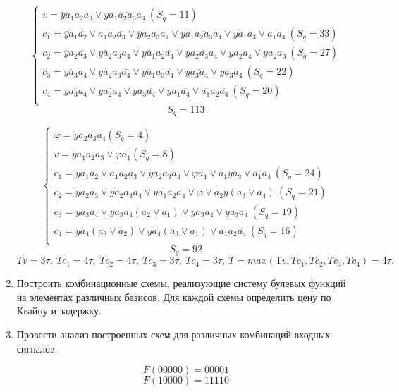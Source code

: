 \documentclass{article}
\begin{document}
\begin{enumerate}
$$\left\{ \begin{array}{l}
       v=  \overline{y}a_1a_2a_3∨y\overline{a_1a_2a_3a_4}\ (S_q=11) \\
       c_1=  \overline{y}a_1\overline{a_2}∨a_1a_2\overline{a_3}∨\overline{y}a_2a_3a_4∨y\overline{a_1a_2a_3a_4}∨ya_1a_3∨a_1a_4\  (S_q=33) \\
       c_2=\overline{y}a_2\overline{a_3}∨\overline{ya_2}a_3a_4∨\overline{ya_1}a_2\overline{a_4}∨y\overline{a_2a_3a_4}∨ya_2a_4∨ya_2a_3\ (S_q=27) \\
       c_3= \overline{ya_3}a_4∨\overline{ya_2}a_3\overline{a_4}∨\overline{ya_1}a_3\overline{a_4}∨y\overline{a_3a_4}∨ya_3a_4\ (S_q=22) \\
       c_4=   \overline{ya_3a_4}∨\overline{ya_2a_4}∨ya_3\overline{a_4}∨ya_1\overline{a_4}∨\overline{a_1}a_2\overline{a_4}\ (S_q=20) \\
\end{array} \right.$$
$$S_q =113$$

$$\left\{ \begin{array}{l}
       φ=y\overline{a_2a_3a_4} (S_q=4) \\
       v=  \bar{y}a_1a_2a_3 ∨φ\bar{a_1} (S_q=8) \\
       c_1=  \overline{y}a_1\overline{a_2}∨a_1a_2\overline{a_3}∨\overline{y}a_2a_3a_4∨φ\overline{a_1}∨a_1ya_3∨a_1a_4\  (S_q=24) \\
       c_2=\overline{y}a_2\overline{a_3}∨\overline{ya_2}a_3a_4∨\overline{ya_1}a_2\overline{a_4}∨φ∨a_2y(a_3∨a_4)\ (S_q=21) \\
       c_3= \overline{ya_3}a_4∨\overline{y}a_3\overline{a_4}(\overline{a_2}∨\overline{a_1})∨ya_3a_4∨y\overline{a_3a_4}\ (S_q=19) \\
       c_4=   \overline{ya_4}(\bar{a_3}∨\bar{a_2})∨y\bar{a_4}(a_3∨a_1)∨\bar{a_1}a_2\bar{a_4}\ (S_q=16) \\
\end{array} \right.$$
$$S_q =92$$
$$Tv=3τ,\ Tc_1=4τ,\ Tc_2=4τ,\ Tc_3=3τ,\ Tc_4=3τ ,\ T= max (Тv, Tc_1, Tc_2, Tc_3, Tc_4)= 4τ.$$

\item Построить комбинационные схемы, реализующие систему булевых
функций на элементах различных базисов. Для каждой схемы определить
цену по Квайну и задержку.
\item Провести анализ построенных схем для различных комбинаций
входных сигналов. 

$$F(00000) = 00001$$
$$F(10000) = 11110$$


\end{enumerate}
\end{document}
